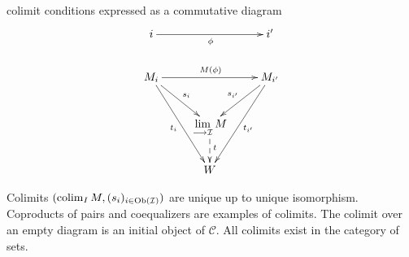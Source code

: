 \begin{frame}
\begin{block}{colimit conditions expressed as a commutative diagram}
\begin{displaymath}
\xymatrix{
i \ar[rr]_{\phi} & & i' \\
M_i \ar[rd]^{s_i} \ar[rdd]_{t_i} \ar[rr]^{M(\phi)} & & M_{i'} \ar[ldd]^{t_{i'}} \ar[ld]_{s_{i'}}\\
& \lim\limits_{\longrightarrow \mathcal{I}} M \ar@{-->}[d]^{t}& \\
& W &
}
\end{displaymath}
\end{block}
\begin{block}{}
Colimits $(\mathop{\rm colim}\nolimits_I M, (s_i)_{i\in \mathop{\rm Ob}\nolimits(\mathcal{I})})$ are unique up to unique isomorphism. Coproducts of pairs and coequalizers are examples of colimits. The colimit over an empty diagram is an initial object of $\mathcal{C}$. All colimits exist in the category of sets.
\end{block}
\end{frame}